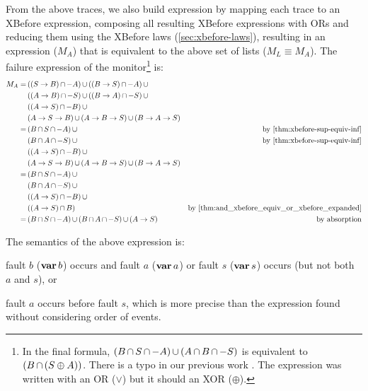 \documentclass[12pt,openright,twoside,a4paper,oldfontcommands,english,brazil,draft]{abntex2}
\theoremstyle{theo}
\def\varop{\ensuremath\operatorname{\mathbf{var}}}
\newcommand{\var}[1]{\ensuremath\varop #1}
\def\xbeforeop{\ensuremath\rightarrow}
\newcommand{\xbefore}[2]{\ensuremath #1 \xbeforeop #2 }
\newcommand{\parsin}[1]{\ensuremath\left( #1 \right)}
\def\union{\ensuremath\operatorname{\cup}}
\def\inter{\ensuremath\operatorname{\cap}}
\begin{document}
From the above traces, we also build  expression by mapping each trace to an XBefore expression, composing all resulting XBefore expressions with ORs and reducing them using the XBefore laws (\cref{sec:xbefore-laws}), resulting in an expression ($M_A$) that is equivalent to the above set of lists ($M_L \equiv M_A$).
The failure expression of the monitor\footnote{In the final formula, $\parsin{B \inter S \inter -A} \union \parsin{A \inter B \inter -S}$ is equivalent to $\parsin{B \inter \parsin{S \oplus A}}$. There is a typo in our previous work \cite{DM2015}. The expression was written with an OR ($\lor$) but it should an XOR ($\oplus$).} is:
%
\begin{align*}
M_A = & \parsin{\parsin{\xbefore{S}{B}} \inter -A} \union \parsin{\parsin{\xbefore{B}{S}} \inter -A} \union\\
  &\parsin{\parsin{\xbefore{A}{B}} \inter -S} \union \parsin{\parsin{\xbefore{B}{A}} \inter -S} \union\\
  & \parsin{\parsin{\xbefore{A}{S}} \inter -B} \union \\
  & \parsin{\xbefore{\xbefore{A}{S}}{B}} \union \parsin{\xbefore{\xbefore{A}{B}}{S}} \union \parsin{\xbefore{\xbefore{B}{A}}{S}} \\
= &\parsin{B \inter S \inter -A} \union & \text{by \eqref{thm:xbefore-sup-equiv-inf}}\\
  & \parsin{B \inter A \inter -S} \union & \text{by \eqref{thm:xbefore-sup-equiv-inf}}\\
  & \parsin{\parsin{\xbefore{A}{S}} \inter -B} \union\\
  & \parsin{\xbefore{\xbefore{A}{S}}{B}} \union \parsin{\xbefore{\xbefore{A}{B}}{S}} \union \parsin{\xbefore{\xbefore{B}{A}}{S}}\\
%
= &\parsin{B \inter S \inter -A} \union \\
  & \parsin{B \inter A \inter -S} \union \\
  & \parsin{\parsin{\xbefore{A}{S}} \inter -B} \union \\
  & \parsin{\parsin{\xbefore{A}{S}} \inter B} & \text{by \eqref{thm:and_xbefore_equiv_or_xbefore_expanded}}\\
%
= &\parsin{B \inter S \inter -A} \union \parsin{B \inter A \inter -S} \union \parsin{\xbefore{A}{S}} & \text{by absorption}
\end{align*}

The semantics of the above expression is:
\begin{alineasinline}
  \item fault $b$ ($\var{b}$) occurs and fault $a$ ($\var{a}$) or fault $s$ ($\var{s}$) occurs (but not both $a$ and $s$), or
  \item fault $a$ occurs before fault $s$, which is more precise than the expression found without considering order of events.
\end{alineasinline}
\end{document}
